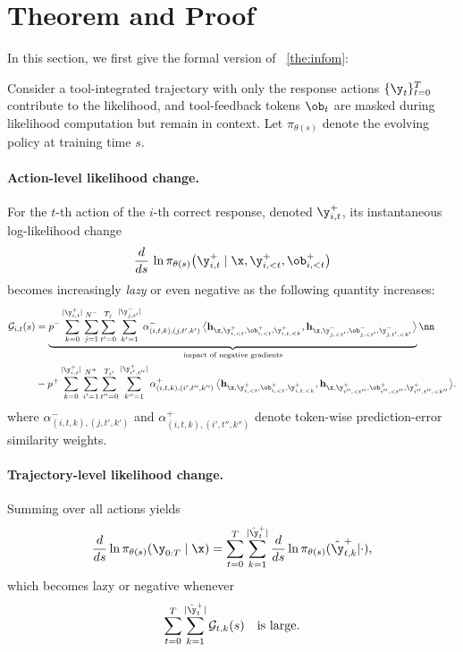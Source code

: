 \section{Theorem and Proof}\label{sec:the_p}
In this section, we first give the formal version of ~\cref{the:infom}:
\begin{tcolorbox}[colframe=black!70, colback=LightGray, boxrule=0.6pt, arc=2pt, left=4pt, right=4pt, top=6pt, bottom=6pt]

\begin{theorem}
\label{the:traj_lld}
Consider a tool-integrated trajectory with only the response actions $\{\y_t\}_{t=0}^{T}$ contribute to the likelihood,
and tool-feedback tokens $\ob_t$ are masked during likelihood computation but remain in context.
Let $\pi_{\theta(s)}$ denote the evolving policy at training time $s$.

\paragraph{Action-level likelihood change.}
For the $t$-th action of the $i$-th correct response, denoted $\y^+_{i,t}$, its instantaneous log-likelihood change 
\[
\frac{d}{ds}\,
\ln \pi_{\theta(s)}\!\left(\y^+_{i,t} \mid \x, \y^+_{i,<t}, \ob^+_{i,<t}\right)
\]
becomes increasingly \emph{lazy} or even negative as the following quantity increases:
\begin{align}
\mathcal{G}_{i,t}(s)
& =
\underbrace{p^-
\sum_{k=0}^{|\y^+_{i,t}|}\sum_{j=1}^{N^-} 
\sum_{t'=0}^{T_j}\sum_{k'=1}^{|\y_{j,t'}^-|}
\alpha^-_{(i,t,k),(j,t',k')}\,
\bigl\langle
\mathbf{h}_{\x,\y^+_{i,<t},\ob^+_{i,<t},\y_{i,t,<k}^+},
\mathbf{h}_{\x,\y^-_{j,<t'},\ob^-_{j,<t'},\y_{j,t',<k'}^-}
\bigr\rangle}_{\text{impact of negative gradients}} \nn
\\ &-
p^+
\sum_{k=0}^{|\y^+_{i,t}|} \sum_{i'=1}^{N^+} \sum_{t''=0}^{T_{i'}}
\sum_{k''=1}^{|\y_{i',t''}^+|}
\alpha^+_{(i,t,k),(i',t'',k'')}\,
\bigl\langle
\mathbf{h}_{\x,\y^+_{i,<t},\ob^+_{i,<t},\y_{i,t,<k}^+},
\mathbf{h}_{\x,\y^+_{i'',<t''},\ob^+_{i'',<t''},\y_{i'',t'',<k''}^+}
\bigr\rangle .
\label{eq:GWHES-tool}
\end{align}
where $\alpha^-_{(i,t,k),(j,t',k')}$ and $\alpha^+_{(i,t,k),(i',t'',k'')}$ denote token-wise prediction-error similarity weights.
\paragraph{Trajectory-level likelihood change.}
Summing over all actions yields
\[
\frac{d}{ds}
\ln \pi_{\theta(s)}\!\left(\y_{0:T}\mid \x\right)
=
\sum_{t=0}^{T}
\sum_{k=1}^{|\hat{\y}_t^+|}
\frac{d}{ds}\ln \pi_{\theta(s)}(\hat{\y}_{t,k}^+|\cdot),
\]
which becomes lazy or negative whenever
\[
\sum_{t=0}^{T}
\sum_{k=1}^{|\hat{\y}_t^+|}
\mathcal{G}_{t,k}(s)
\quad\text{is large}.
\]
\end{theorem}
\end{tcolorbox}

